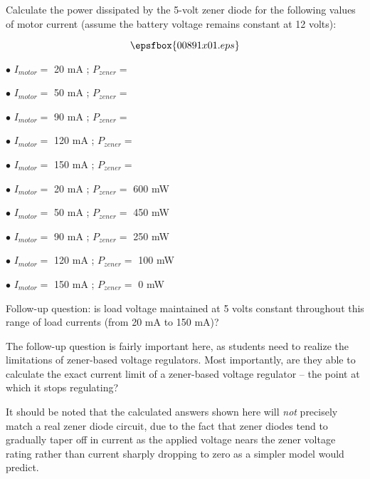 

Calculate the power dissipated by the 5-volt zener diode for the following values of motor current (assume the battery voltage remains constant at 12 volts):

$$\epsfbox{00891x01.eps}$$

\medskip
\item{$\bullet$} $I_{motor} =$ 20 mA ; $P_{zener} =$ 
\item{$\bullet$} $I_{motor} =$ 50 mA ; $P_{zener} =$ 
\item{$\bullet$} $I_{motor} =$ 90 mA ; $P_{zener} =$ 
\item{$\bullet$} $I_{motor} =$ 120 mA ; $P_{zener} =$ 
\item{$\bullet$} $I_{motor} =$ 150 mA ; $P_{zener} =$ 
\medskip







\medskip
\item{$\bullet$} $I_{motor} =$ 20 mA ; $P_{zener} =$ 600 mW
\item{$\bullet$} $I_{motor} =$ 50 mA ; $P_{zener} =$ 450 mW
\item{$\bullet$} $I_{motor} =$ 90 mA ; $P_{zener} =$ 250 mW
\item{$\bullet$} $I_{motor} =$ 120 mA ; $P_{zener} =$ 100 mW
\item{$\bullet$} $I_{motor} =$ 150 mA ; $P_{zener} =$ 0 mW
\medskip

\vskip 10pt

Follow-up question: is load voltage maintained at 5 volts constant throughout this range of load currents (from 20 mA to 150 mA)?







The follow-up question is fairly important here, as students need to realize the limitations of zener-based voltage regulators.  Most importantly, are they able to calculate the exact current limit of a zener-based voltage regulator -- the point at which it stops regulating?

It should be noted that the calculated answers shown here will {\it not} precisely match a real zener diode circuit, due to the fact that zener diodes tend to gradually taper off in current as the applied voltage nears the zener voltage rating rather than current sharply dropping to zero as a simpler model would predict.




